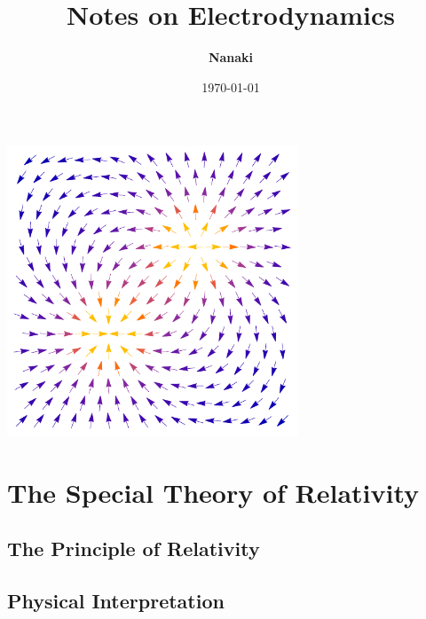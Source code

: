 \documentclass[
    ebook,
    11pt,
    oneside,
    onecolumn,
    openright,
    final
]{memoir}
\numberwithin{equation}{section}
\begin{document}
\begin{titlingpage}
	\title{\HUGE\textbf{Notes on Electrodynamics}}
	\author{\Large\textbf{Nanaki}}
	\date{\Large{\today}}

	\maketitle
	\begin{center}
		\includegraphics[width=0.65\textwidth]{figures/cover.pdf}
	\end{center}
\end{titlingpage}

\frontmatter

\tableofcontents

\mainmatter

% 

\part{The Special Theory of Relativity}

\chapter{The Principle of Relativity}

\chapter{Physical Interpretation}
\end{document}
